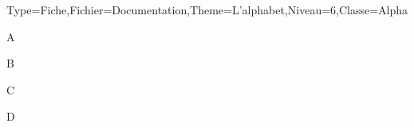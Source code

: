 \documentclass[12pt,french]{article}
\begin{document}
\begin{Maquette}[ParcoursPerso]{Type=Fiche,Fichier=Documentation,Theme=L'alphabet,Niveau=6,Classe=Alpha}
  \begin{exercice}
    A
  \end{exercice}
  \begin{exercice}
    B
  \end{exercice}
  \begin{exercice}
    C
  \end{exercice}
  \begin{exercice}
    D
  \end{exercice}
\end{Maquette}
\end{document}
